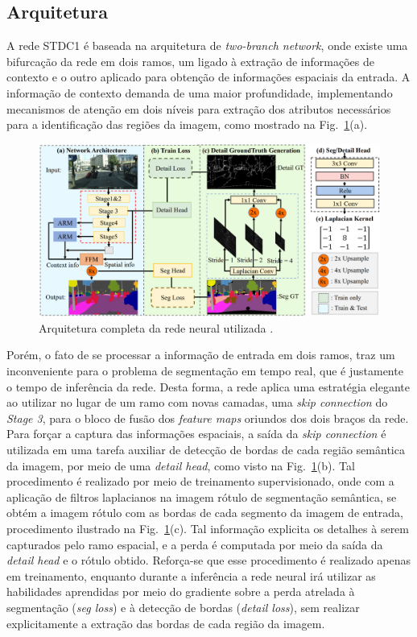 \documentclass[conference]{IEEEtran}
\begin{document}
\subsection{Arquitetura}

A rede STDC1 \cite{fan2021RethinkingBiSeNetRealtime} é baseada na arquitetura de \textit{two-branch network}, onde existe uma bifurcação da rede em dois ramos, um ligado à extração de informações de contexto e o outro aplicado para obtenção de informações espaciais da entrada. A informação de contexto demanda de uma maior profundidade, implementando mecanismos de atenção em dois níveis para extração dos atributos necessários para a identificação das regiões da imagem, como mostrado na Fig.~\ref{fig:stdcseg-architecture}(a).

\begin{figure}[h!]
	\centering
	\includegraphics[width=1\linewidth]{img/stdcseg-architecture}
	\caption{Arquitetura completa da rede neural utilizada \cite{fan2021RethinkingBiSeNetRealtime}.}
	\label{fig:stdcseg-architecture}
\end{figure}

Porém, o fato de se processar a informação de entrada em dois ramos, traz um inconveniente para o problema de segmentação em tempo real, que é justamente o tempo de inferência da rede. Desta forma, a rede aplica uma estratégia elegante ao utilizar no lugar de um ramo com novas camadas, uma \textit{skip connection} do \textit{Stage 3}, para o bloco de fusão dos \textit{feature maps} oriundos dos dois braços da rede. Para forçar a captura das informações espaciais, a saída da \textit{skip connection} é utilizada em uma tarefa auxiliar de detecção de bordas de cada região semântica da imagem, por meio de uma \textit{detail head}, como visto na Fig.~\ref{fig:stdcseg-architecture}(b). Tal procedimento é realizado por meio de treinamento supervisionado, onde com a aplicação de filtros laplacianos na imagem rótulo de segmentação semântica, se obtém a imagem rótulo com as bordas de cada segmento da imagem de entrada, procedimento ilustrado na Fig.~\ref{fig:stdcseg-architecture}(c). Tal informação explicita os detalhes à serem capturados pelo ramo espacial, e a perda é computada por meio da saída da \textit{detail head} e o rótulo obtido. Reforça-se que esse procedimento é realizado apenas em treinamento, enquanto durante a inferência a rede neural irá utilizar as habilidades aprendidas por meio do gradiente sobre a perda atrelada à segmentação (\textit{seg loss}) e à detecção de bordas (\textit{detail loss}), sem realizar explicitamente a extração das bordas de cada região da imagem.
\end{document}
